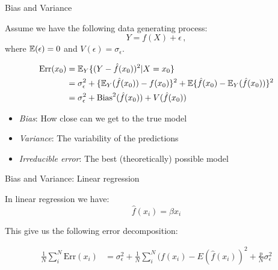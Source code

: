 \documentclass[10pt,handout]{beamer}
\begin{document}
\begin{frame}{Bias and Variance}

Assume we have the following data generating process:
\[
Y = f(X) + \epsilon\,,
\]
where $\operatorname{\mathbb{E}}(\epsilon)=0$ and $V(\epsilon)=\sigma_\epsilon$.

\begin{align*}
\text{Err}(x_0) &= \operatorname{\mathbb{E}}_{Y}\{(Y-\hat{f}(x_0))^2 | X = x_0\} \\
  &= \sigma^2_\epsilon + \{\operatorname{\mathbb{E}}_Y(\hat{f}(x_0)) - f(x_0)\}^2 + \operatorname{\mathbb{E}}\{\hat{f}(x_0) - \operatorname{\mathbb{E}}_Y(\hat{f}(x_0))\}^2 \\
  &= \sigma^2_\epsilon + \text{Bias}^2(\hat{f}(x_0)) + V(\hat{f}(x_0))
\end{align*}

\begin{itemize}
\item \emph{Bias}: How close can we get to the true model
\item \emph{Variance}: The variability of the predictions
\item \emph{Irreducible error}: The best (theoretically) possible model
\end{itemize}

\end{frame}


\begin{frame}{Bias and Variance: Linear regression}

In linear regression we have:
\[
\hat{f}(x_i) = \hat{\beta} x_i
\]

This give us the following error decomposition:

\begin{align*}
\frac{1}{N}\sum^N_i \text{Err}(x_i) &= \sigma^2_\epsilon + \frac{1}{N}\sum^N_i (f(x_i) - E(\hat{f}(x_i))^2 + \frac{p}{N} \sigma^2_\epsilon
\end{align*}

\end{frame}
\end{document}
